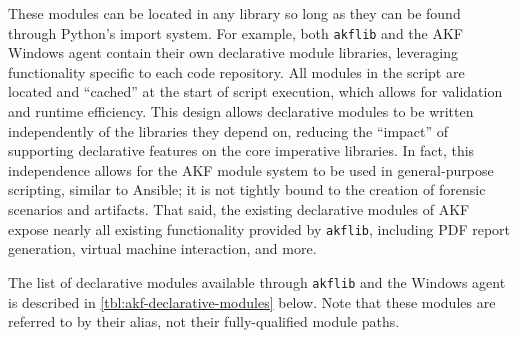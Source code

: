 These modules can be located in any library so long as they can be found
through Python's import system. For example, both
\passthrough{\lstinline!akflib!} and the AKF Windows agent contain their
own declarative module libraries, leveraging functionality specific to
each code repository. All modules in the script are located and
``cached'' at the start of script execution, which allows for validation
and runtime efficiency. This design allows declarative modules to be
written independently of the libraries they depend on, reducing the
``impact'' of supporting declarative features on the core imperative
libraries. In fact, this independence allows for the AKF module system
to be used in general-purpose scripting, similar to Ansible; it is not
tightly bound to the creation of forensic scenarios and artifacts. That
said, the existing declarative modules of AKF expose nearly all existing
functionality provided by \passthrough{\lstinline!akflib!}, including
PDF report generation, virtual machine interaction, and more.

The list of declarative modules available through
\passthrough{\lstinline!akflib!} and the Windows agent is described in
\autoref{tbl:akf-declarative-modules} below. Note that these modules are
referred to by their alias, not their fully-qualified module paths.


